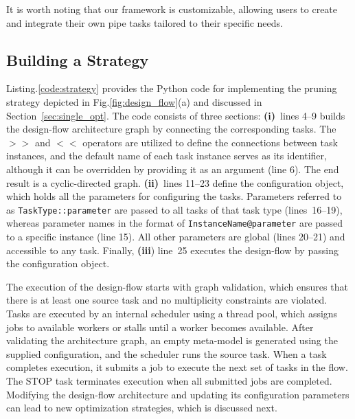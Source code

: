 It is worth noting that our framework is customizable, allowing users to create and integrate their own pipe tasks tailored to their specific needs.

\subsection{Building a Strategy}




Listing.\ref{code:strategy} provides the Python code for implementing the pruning strategy depicted in Fig.\ref{fig:design_flow}(a) and discussed in Section~\ref{sec:single_opt}. The code consists of three sections: \textbf{(i)}~lines 4--9 builds the design-flow architecture graph by connecting the corresponding tasks. The $>>$ and $<<$ operators are utilized to define the connections between task instances, and the default name of each task instance serves as its identifier, although it can be overridden by providing it as an argument (line 6). The end result is a cyclic-directed graph. \textbf{(ii)}~lines 11--23 define the configuration object, which holds all the parameters for configuring the tasks. Parameters referred to as \texttt{TaskType::parameter} are passed to all tasks of that task type (lines~16--19), whereas parameter names in the format of \texttt{InstanceName@parameter} are passed to a specific instance (line 15). All other parameters are global (lines 20--21) and accessible to any task.  Finally, \textbf{(iii}) line~25 executes the design-flow by passing the configuration object.


The execution of the design-flow starts with graph validation, which ensures that there is at least one source task and no multiplicity constraints are violated. Tasks are executed by an internal scheduler using a thread pool, which assigns jobs to available workers or stalls until a worker becomes available. After validating the architecture graph, an empty meta-model is generated using the supplied configuration, and the scheduler runs the source task. When a task completes execution, it submits a job to execute the next set of tasks in the flow. The STOP task terminates execution when all submitted jobs are completed. Modifying the design-flow architecture and updating its configuration parameters can lead to new optimization strategies, which is discussed next.


